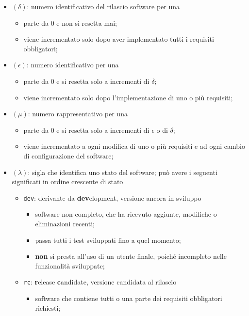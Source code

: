 		\begin{itemize}
			\item \((\delta)\): numero identificativo del rilascio software per una 
			\begin{itemize}
				\item parte da 0 e non si resetta mai;
				\item viene incrementato solo dopo aver implementato tutti i requisiti obbligatori;
			\end{itemize}
			\item \((\epsilon)\): numero identificativo per una 
			\begin{itemize}
				\item parte da 0 e si resetta solo a incrementi di \(\delta\);
				\item viene incrementato solo dopo l'implementazione di uno o più requisiti;
			\end{itemize}
			\item \((\mu)\): numero rappresentativo per una 
			\begin{itemize}
				\item parte da 0 e si resetta solo a incrementi di \(\epsilon\) o di \(\delta\);
				\item viene incrementato a ogni modifica di uno o più requisiti e ad ogni cambio di configurazione del software;
			\end{itemize}
			\item \((\lambda)\): sigla che identifica uno stato del software; può avere i seguenti significati in ordine crescente di stato
			\begin{itemize}
				\item \verb!dev!: derivante da \textbf{dev}elopment, versione ancora in sviluppo
					\begin{itemize}
						\item software non completo, che ha ricevuto aggiunte, modifiche o eliminazioni recenti;
						\item passa tutti i test sviluppati fino a quel momento;
						\item \textbf{non} si presta all'uso di un utente finale, poiché incompleto nelle funzionalità sviluppate;
					\end{itemize}
				\item \verb!rc!: \textbf{r}elease \textbf{c}andidate, versione candidata al rilascio
				\begin{itemize}
					\item software che contiene tutti o una parte dei requisiti obbligatori richiesti;

\end{itemize}
\end{itemize}
\end{itemize}

